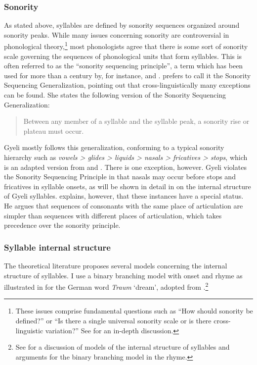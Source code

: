 
\subsubsection*{Sonority} As stated above, syllables are defined by sonority sequences organized around sonority peaks. While many issues concerning sonority are controversial in phonological theory,\footnote {These issues comprise fundamental questions such as ``How should sonority be defined?'' or ``Is there a single universal sonority scale or is there cross-linguistic variation?'' See \citet{clements90} for an in-depth discussion.} most phonologists agree that there is some sort of sonority scale governing the sequences of phonological units that form syllables. This is often referred to as the ``sonority sequencing principle'', a term which has been used for more than a century by, for instance, \citet{jespersen04} and \citet{selkirk84}. \citet[210-211]{blevins95} prefers to call it the Sonority Sequencing Generalization, pointing out that cross-linguistically many exceptions can be found. She states the following version of the Sonority Sequencing Generalization:

\begin{quote}
Between any member of a syllable and the syllable peak, a sonority rise or plateau must occur. \citep[210]{blevins95}
\end{quote}

Gyeli mostly follows this generalization, conforming to a typical sonority hierarchy such as {\itshape vowels > glides > liquids > nasals > fricatives > stops}, which is an adapted version from \citet{clements90} and \citet{blevins95}. There is one exception, however. Gyeli violates the Sonority Sequencing Principle in that nasals may occur before stops and fricatives in syllable onsets, as will be shown in detail in  on the internal structure of Gyeli syllables. \citet[321]{clements90} explains, however, that these instances have a special status.  He argues that sequences of consonants with the same place of articulation are simpler than sequences with different places of articulation, which takes precedence over the sonority principle.

\subsubsection*{Syllable internal structure} The theoretical literature proposes several models concerning the internal structure of syllables. I use a binary branching model with onset and rhyme as illustrated in  for the German word {\itshape Traum} `dream', adopted from \citet[213]{blevins95}.\footnote{See \citet[212-14]{blevins95} for a discussion of models of the internal structure of syllables and arguments for the binary branching model in the rhyme.}

